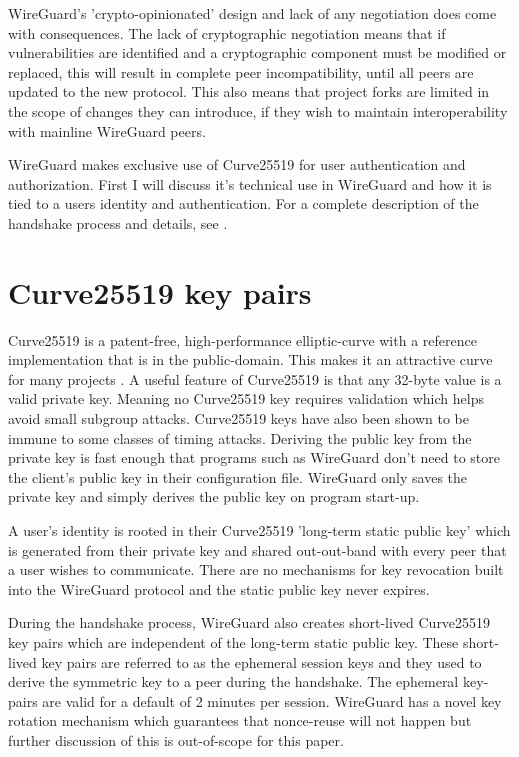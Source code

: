 \documentclass [11pt, proquest] {uwthesis}[2020/02/24]
\begin{document}
WireGuard's 'crypto-opinionated' design and lack of any negotiation does come with consequences. The lack of cryptographic negotiation means that if vulnerabilities are identified and a cryptographic component must be modified or replaced, this will result in complete peer incompatibility, until all peers are updated to the new protocol. 
This also means that project forks are limited in the scope of changes they can introduce, if they wish to maintain interoperability with mainline WireGuard peers.

WireGuard makes exclusive use of Curve25519 for user authentication and authorization. First I will discuss it's technical use in WireGuard and how it is tied to a users identity and authentication. For a complete description of the handshake process and details, see \cite{donenfeld_protocol_2018}\cite{donenfeld_wireguard_2017}.

\section{Curve25519 key pairs} \label{x25519}
Curve25519 is a patent-free, high-performance elliptic-curve with a reference implementation that is in the public-domain. This makes it an attractive curve for many projects \cite{noauthor_things_2022}.
A useful feature of Curve25519 is that any 32-byte value is a valid private key. Meaning no Curve25519 key requires validation which helps avoid small subgroup attacks. Curve25519 keys have also been shown to be immune to some classes of timing attacks\cite{noauthor_safecurves_2022}\cite{sasdrich_implementing_2015}.  Deriving the public key from the private key is fast enough that programs such as WireGuard don't need to store the client's public key in their configuration file. WireGuard only saves the private key and simply derives the public key on program start-up.

A user's identity is rooted in their Curve25519 'long-term static public key' which is generated from their private key and shared out-out-band with every peer that a user wishes to communicate.  
There are no mechanisms for key revocation built into the WireGuard protocol and the static public key never expires.

During the handshake process, WireGuard also creates short-lived Curve25519 key pairs which are independent of the long-term static public key. These short-lived key pairs are referred to as the ephemeral session keys and they used to derive the symmetric key to a peer during the handshake. 
The ephemeral key-pairs are valid for a default of 2 minutes per session. WireGuard has a novel key rotation mechanism which guarantees that nonce-reuse will not happen but further discussion of this is out-of-scope for this paper. 
\end{document}
